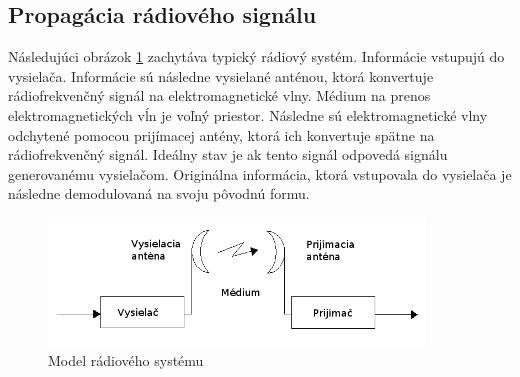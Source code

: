\documentclass[11pt,twoside,a4paper]{book}
\begin{document}



\subsection{Propagácia rádiového signálu}

Následujúci obrázok \ref{fig:RSP} zachytáva typický rádiový systém. Informácie vstupujú do vysielača. Informácie sú následne 
vysielané anténou, ktorá konvertuje rádiofrekvenčný signál na elektromagnetické vlny. Médium na prenos elektromagnetických vĺn je voľný priestor. Následne sú elektromagnetické vlny odchytené pomocou prijímacej antény, ktorá ich konvertuje spätne na rádiofrekvenčný signál. Ideálny stav je ak tento signál odpovedá signálu generovanému vysielačom. Originálna informácia, ktorá vstupovala do vysielača je následne demodulovaná na svoju pôvodnú formu.

\begin{figure}[h]
 \centering
 \includegraphics[width=10cm]{./figures/RSM.png}
 \caption{Model rádiového systému}
 \label{fig:RSP}
\end{figure}
\end{document}
